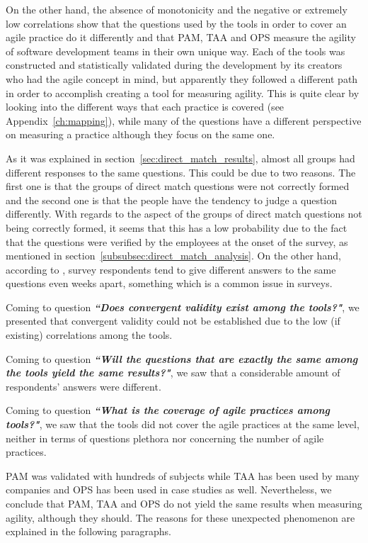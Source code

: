 On the other hand, the absence of monotonicity and the negative or extremely low correlations show that the questions used by the tools in order to cover an agile practice do it differently and that \ac{PAM}, \ac{TAA} and \ac{OPS} measure the agility of software development teams in their own unique way. Each of the tools was constructed and statistically validated during the development by its creators who had the agile concept in mind, but apparently they followed a different path in order to accomplish creating a tool for measuring agility. This is quite clear by looking into the different ways that each practice is covered (see Appendix~\ref{ch:mapping}), while many of the questions have a different perspective on measuring a practice although they focus on the same one. 

As it was explained in section~\ref{sec:direct_match_results}, almost all groups had different responses to the same questions. This could be due to two reasons. The first one is that the groups of direct match questions were not correctly formed and the second one is that the people have the tendency to judge a question differently. With regards to the aspect of the groups of direct match questions not being correctly formed, it seems that this has a low probability due to the fact that the questions were verified by the employees at the onset of the survey, as mentioned in section~\ref{subsubsec:direct_match_analysis}. On the other hand, according to \citet{Lacy}, survey respondents tend to give different answers to the same questions even weeks apart, something which is a common issue in surveys.

Coming to question \textbf{\textit{``Does convergent validity exist among the tools?"}}, we presented that convergent validity could not be established due to the low (if existing) correlations among the tools.

Coming to question \textbf{\textit{``Will the questions that are exactly the same among the tools yield the same results?"}}, we saw that a considerable amount of respondents' answers were different.

Coming to question \textbf{\textit{``What is the coverage of agile practices among tools?"}}, we saw that the tools did not cover the agile practices at the same level, neither in terms of questions plethora nor concerning the number of agile practices.

\ac{PAM} was validated with hundreds of subjects while \ac{TAA} has been used by many companies and \ac{OPS} has been used in case studies as well. Nevertheless, we conclude that \ac{PAM}, \ac{TAA} and \ac{OPS} do not yield the same results when measuring agility, although they should. The reasons for these unexpected phenomenon are explained in the following paragraphs.

